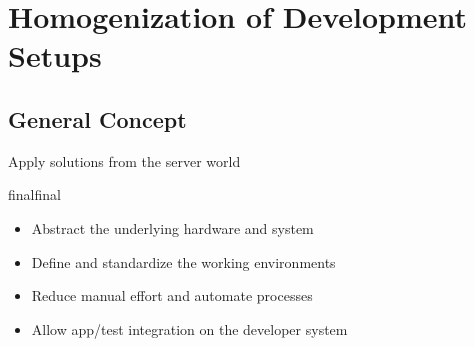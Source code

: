 \documentclass{beamer}
\def\final{final}
\def\status{final}
\begin{document}


\section{Homogenization of Development Setups}


\subsection{General Concept}
\begin{frame}{}
  \begin{center}
    \Large Apply solutions from the server world
  \end{center}
  \vspace{.8cm}

  \ifx\status\final{}
    \pause{}
  \fi

  \begin{itemize}
    \setlength\itemsep{1.2em}
    \large
    \item Abstract the underlying hardware and system
    \item Define and standardize the working environments
    \item Reduce manual effort and automate processes
    \item Allow app/test integration on the developer system
  \end{itemize}
\end{frame}

\end{document}
